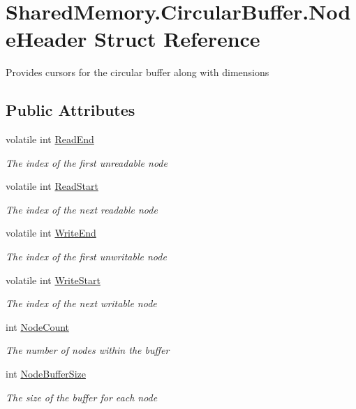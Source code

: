 \hypertarget{struct_shared_memory_1_1_circular_buffer_1_1_node_header}{}\section{Shared\+Memory.\+Circular\+Buffer.\+Node\+Header Struct Reference}
\label{struct_shared_memory_1_1_circular_buffer_1_1_node_header}


Provides cursors for the circular buffer along with dimensions  


\subsection*{Public Attributes}
\begin{DoxyCompactItemize}
\item 
volatile int \hyperlink{struct_shared_memory_1_1_circular_buffer_1_1_node_header_a76f6ce2a18e7aa6256ddf4c94778c1c6}{Read\+End}
\begin{DoxyCompactList}\small\item\em The index of the first unreadable node \end{DoxyCompactList}\item 
volatile int \hyperlink{struct_shared_memory_1_1_circular_buffer_1_1_node_header_ad0dcc27048e0567fa72cca467ef97db0}{Read\+Start}
\begin{DoxyCompactList}\small\item\em The index of the next readable node \end{DoxyCompactList}\item 
volatile int \hyperlink{struct_shared_memory_1_1_circular_buffer_1_1_node_header_a2a643c3dd7d6344ed9bf16fd613b27f6}{Write\+End}
\begin{DoxyCompactList}\small\item\em The index of the first unwritable node \end{DoxyCompactList}\item 
volatile int \hyperlink{struct_shared_memory_1_1_circular_buffer_1_1_node_header_a7fc8c2c6403cba9549ca7673a393b1b4}{Write\+Start}
\begin{DoxyCompactList}\small\item\em The index of the next writable node \end{DoxyCompactList}\item 
int \hyperlink{struct_shared_memory_1_1_circular_buffer_1_1_node_header_a5bcbd547f640a9b5cbc5bc05af42c564}{Node\+Count}
\begin{DoxyCompactList}\small\item\em The number of nodes within the buffer \end{DoxyCompactList}\item 
int \hyperlink{struct_shared_memory_1_1_circular_buffer_1_1_node_header_a5dbe6b2941fea882c3d253d8eee9ef10}{Node\+Buffer\+Size}
\begin{DoxyCompactList}\small\item\em The size of the buffer for each node \end{DoxyCompactList}\end{DoxyCompactItemize}


